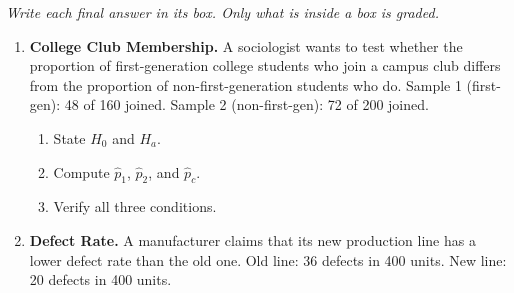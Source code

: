 \documentclass[10pt]{article}
\begin{document}
{\small\itshape Write each final answer in its box. Only what is inside a box is graded.}\par

\vspace{0.15in}

\begin{enumerate}

\item \textbf{College Club Membership.} A sociologist wants to test whether the proportion
of first-generation college students who join a campus club differs from the proportion of
non-first-generation students who do. Sample 1 (first-gen): 48 of 160 joined.
Sample 2 (non-first-gen): 72 of 200 joined.

\begin{enumerate}[label=\alph*.]
  \item State $H_0$ and $H_a$. 
  \item Compute $\hat p_1$, $\hat p_2$, and $\hat p_c$. \writeline\\
  \item Verify all three conditions. 
\end{enumerate}

\newpage
\item \textbf{Defect Rate.} A manufacturer claims that its new production line has a lower
defect rate than the old one. Old line: 36 defects in 400 units. New line: 20 defects in 400 units.


\end{enumerate}
\end{document}

